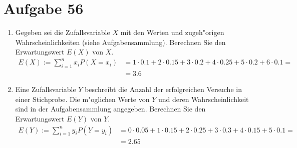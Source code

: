 \section{Aufgabe 56}
\setcounter{section}{56}

\begin{enumerate}
    \item Gegeben sei die Zufallsvariable $X$ mit den Werten und zugeh"origen Wahrscheinlichkeiten (siehe Aufgabensammlung).
        Berechnen Sie den Erwartungswert $E(X)$ von $X$.
        \begin{align*}
            E(X) := \sum_{i = 1}^n x_iP(X = x_i) &= 1 \cdot 0.1 + 2 \cdot 0.15 + 3 \cdot 0.2 + 4 \cdot 0.25 + 5 \cdot 0.2 + 6 \cdot 0.1 = \\
                                                 &= 3.6
        \end{align*}
    \item Eine Zufallsvariable $Y$ beschreibt die Anzahl der erfolgreichen
        Versuche in einer Stichprobe. Die m"oglichen Werte von $Y$ und deren
        Wahrscheinlichkeit sind in der Aufgabensammlung angegeben.
        Berechnen Sie den Erwartungswert $E(Y)$ von $Y$.
        \begin{align*}
            E(Y) := \sum_{i = 1}^n y_iP(Y = y_i) &= 0 \cdot 0.05 + 1 \cdot 0.15 + 2 \cdot 0.25 + 3 \cdot 0.3 + 4 \cdot 0.15 + 5 \cdot 0.1 = \\
                                                 &= 2.65
        \end{align*}
\end{enumerate}
